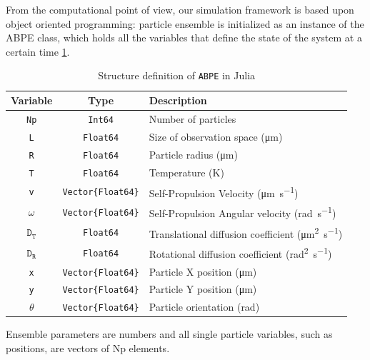 \documentclass[../../master_thesis_np.tex]{subfiles}
\begin{document}
	From the computational point of view, our simulation framework is based upon object oriented programming: particle ensemble is initialized as an instance of the ABPE class, which holds all the variables that define the state of the system at a certain time \ref{tab:ABPE2}. 
	\begin{table}[h]
		\centering
		\begin{tabular}{c|cl}
			\textbf{Variable} & \textbf{Type} & \textbf{Description} \\
			\hline
			\texttt{Np}  & \texttt{Int64} & Number of particles \\
			\texttt{L}   & \texttt{Float64} & Size of observation space (\unit{\micro\meter}) \\
			\texttt{R}   & \texttt{Float64} & Particle radius (\unit{\micro\meter}) \\
			\texttt{T}   & \texttt{Float64} & Temperature (\unit{\kelvin}) \\
			\texttt{v}   & \texttt{Vector\{Float64\}} & Self-Propulsion Velocity (\unit{\micro\meter\per\second}) \\
			\texttt{$\mathtt{\omega}$}   & \texttt{Vector\{Float64\}} & Self-Propulsion Angular velocity (\unit{\radian\per\second}) \\
			$\mathtt{D_T}$  & \texttt{Float64} & Translational diffusion coefficient (\unit{\square\micro\meter\per\second}) \\
			$\mathtt{D_R}$  & \texttt{Float64} & Rotational diffusion coefficient (\unit{\square\radian\per\second}) \\
			\texttt{x}   & \texttt{Vector\{Float64\}} & Particle X position (\unit{\micro\meter}) \\
			\texttt{y}   & \texttt{Vector\{Float64\}} & Particle Y position (\unit{\micro\meter}) \\
			\texttt{$\mathtt{\theta}$}   & \texttt{Vector\{Float64\}} & Particle orientation (\unit{\radian}) \\
		\end{tabular}
		\caption{Structure definition of \texttt{ABPE} in Julia}
		\label{tab:ABPE2}
	\end{table}
	Ensemble parameters are numbers and all single particle variables, such as positions, are vectors of Np elements. %
	
\end{document}
